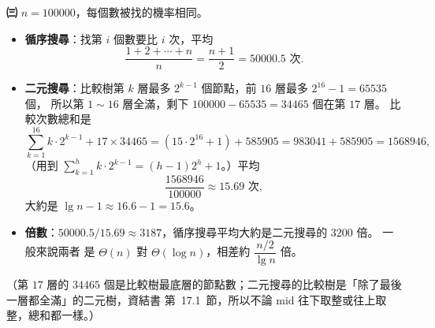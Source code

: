 \begin{pastsoln}
\textbf{㈢} $n = 100000$，每個數被找的機率相同。
\begin{itemize}
\item \textbf{循序搜尋}：找第 $i$ 個數要比 $i$ 次，平均
\[
\frac{1 + 2 + \cdots + n}{n} = \frac{n + 1}{2} = 50000.5 \text{ 次}.
\]
\item \textbf{二元搜尋}：比較樹第 $k$ 層最多 $2^{k-1}$ 個節點，前 $16$ 層最多 $2^{16} - 1 = 65535$ 個，
所以第 $1 \sim 16$ 層全滿，剩下 $100000 - 65535 = 34465$ 個在第 $17$ 層。 比較次數總和是
\[
\sum_{k=1}^{16} k \cdot 2^{k-1} + 17 \times 34465 = (15 \cdot 2^{16} + 1) + 585905 = 983041 + 585905 = 1568946,
\]
（用到 $\sum_{k=1}^{h} k \cdot 2^{k-1} = (h - 1)2^h + 1$。）平均
\[
\frac{1568946}{100000} \approx 15.69 \text{ 次},
\]
大約是 $\lg n - 1 \approx 16.6 - 1 = 15.6$。
\item \textbf{倍數}：$50000.5 / 15.69 \approx 3187$，循序搜尋平均大約是二元搜尋的 $3200$ 倍。 一般來說兩者
是 $\Theta(n)$ 對 $\Theta(\log n)$，相差約 $\dfrac{n/2}{\lg n}$ 倍。
\end{itemize}
（第 $17$ 層的 $34465$ 個是比較樹最底層的節點數；二元搜尋的比較樹是「除了最後一層都全滿」的二元樹，資結書
第~17.1~節，所以不論 mid 往下取整或往上取整，總和都一樣。）
\end{pastsoln}
